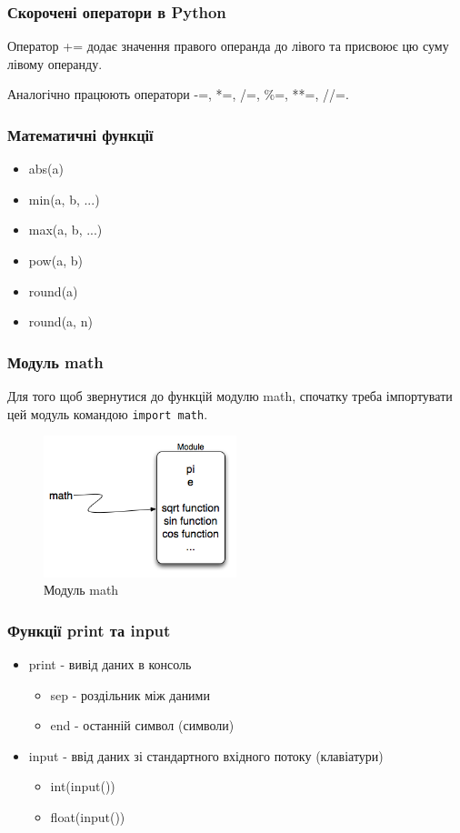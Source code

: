 \begin{frame}
\frametitle{Скорочені оператори в Python}
Оператор += додає значення правого операнда до лівого та присвоює цю суму лівому операнду.

Аналогічно працюють оператори -=, *=, /=, \%=, **=, //=.  
\end{frame}


\begin{frame}
\frametitle{Математичні функції}
\begin{itemize}
  \item abs(a)
  \item min(a, b, ...)
  \item max(a, b, ...)
  \item pow(a, b)
  \item round(a)
  \item round(a, n)
\end{itemize} 
  
\end{frame}

\begin{frame}
\frametitle{Модуль math}
Для того щоб звернутися до функцій модулю math, спочатку треба імпортувати цей модуль командою \texttt{import math}.
\begin{figure}
\begin{center}
 \includegraphics[width=0.5\textwidth]{pictures/mathmod.png}
\caption{Модуль math}
\label{mathmodule} 
\end{center}
\end{figure}
\end{frame}

\begin{frame}
\frametitle{Функції print та input}
\begin{itemize}
  \item print - вивід даних в консоль
      \begin{itemize}
        \item sep - роздільник між даними
        \item end - останній символ (символи)
     \end{itemize} 
  \item input - ввід даних зі стандартного вхідного потоку (клавіатури)
      \begin{itemize}
        \item int(input())
        \item float(input())
     \end{itemize}
 \end{itemize} 
\end{frame}

